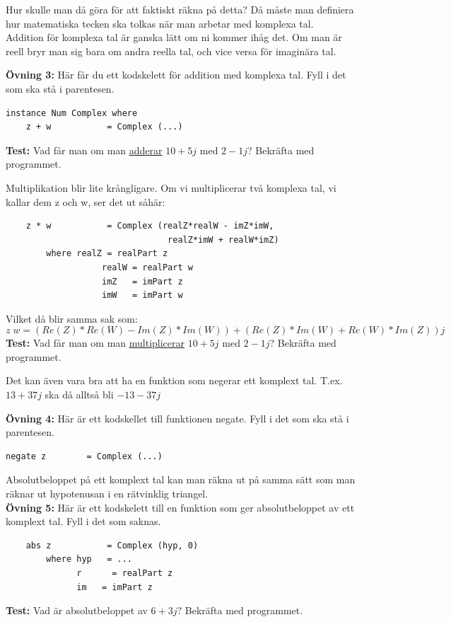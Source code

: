 \documentclass{article}
\begin{document}
Hur skulle man då göra för att faktiskt räkna på detta? Då måste man definiera hur matematiska tecken ska tolkas när man arbetar med komplexa tal.\\

Addition för komplexa tal är ganska lätt om ni kommer ihåg det. Om man är reell bryr man sig bara om andra reella tal, och vice versa för imaginära tal.

\textbf{Övning 3:} Här får du ett kodskelett för addition med komplexa tal. Fyll i det som ska stå i parentesen.
\begin{verbatim}
instance Num Complex where
    z + w           = Complex (...)
\end{verbatim}
\textbf{Test:} Vad får man om man \underline{adderar} $10 + 5j$ med $2 -1j$? Bekräfta med programmet.

Multiplikation blir lite krångligare. Om vi multiplicerar två komplexa tal, vi kallar dem z och w, ser det ut såhär:
\begin{verbatim}
    z * w           = Complex (realZ*realW - imZ*imW,
                                realZ*imW + realW*imZ)
        where realZ = realPart z
                   realW = realPart w
                   imZ   = imPart z
                   imW   = imPart w
\end{verbatim}
Vilket då blir samma sak som:
$$z \; w = (Re(Z) * Re(W) - Im(Z)*Im(W)) + (Re(Z)*Im(W) + Re(W)*Im(Z))j$$
\textbf{Test:} Vad får man om man \underline{multiplicerar} $10 + 5j$ med $2 -1j$? Bekräfta med programmet.

Det kan även vara bra att ha en funktion som negerar ett komplext tal. T.ex. $13+37j$ ska då alltså bli $-13-37j$

\textbf{Övning 4:} Här är ett kodskellet till funktionen negate. Fyll i det som ska stå i parentesen.
\begin{verbatim}
negate z        = Complex (...)
\end{verbatim}
Absolutbeloppet på ett komplext tal kan man räkna ut på samma sätt som man räknar ut hypotenusan i en rätvinklig triangel.\\

\textbf{Övning 5:} Här är ett kodskelett till en funktion som ger absolutbeloppet av ett komplext tal. Fyll i det som saknas.
\begin{verbatim}
    abs z           = Complex (hyp, 0)
        where hyp   = ...
              r      = realPart z
              im   = imPart z
\end{verbatim}
\textbf{Test:} Vad är absolutbeloppet av $6 + 3j$? Bekräfta med programmet.
\end{document}
